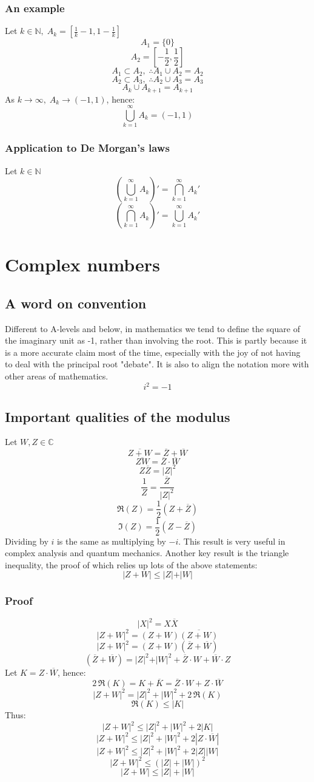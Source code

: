 \documentclass[12pt]{article}
\begin{document}
\subsubsection*{An example}
Let \(k\in \mathbb{N},\;A_k=\left[\frac{1}{k}-1,1-\frac{1}{k}\right]\)
\[A_1=\{0\}\]
\[A_2=\left[-\frac{1}{2},\frac{1}{2}\right]\]
\[A_1\subset A_2,\;\therefore A_1\cup A_2=A_2\]
\[A_2\subset A_3,\;\therefore A_2\cup A_3=A_3\]
\[A_k\cup A_{k+1}=A_{k+1}\]
As \(k\to\infty,\;A_k\to(-1,1)\), hence:
\[\bigcup_{k=1}^{\infty}A_k=(-1,1)\]
\subsubsection*{Application to De Morgan's laws}
Let \(k\in\mathbb{N}\)
\[\left(\bigcup_{k=1}^{\infty}A_k\right)'=\bigcap_{k=1}^{\infty}{A_k}'\]
\[\left(\bigcap_{k=1}^{\infty}A_k\right)'=\bigcup_{k=1}^{\infty}{A_k}'\]
\section{Complex numbers}
\subsection*{A word on convention}
Different to A-levels and below, in mathematics we tend to define the square of the imaginary unit as -1, rather than involving the root. This is partly because it is a more accurate claim most of the time, especially with the joy of not having to deal with the principal root "debate". It is also to align the notation more with other areas of mathematics.
\[i^2=-1\]
\subsection*{Important qualities of the modulus}
Let \(W,Z\in\mathbb{C}\)
\[\overline{Z+W}=\overline{Z}+\overline{W}\]
\[\overline{ZW}=\overline{Z}\cdot\overline{W}\]
\[Z\overline{Z}=\vert Z\vert^2\]
\[\frac{1}{Z}=\frac{\overline{Z}}{\vert Z\vert^2}\]
\[\Re(Z)=\frac{1}{2}(Z+\overline{Z})\]
\[\Im(Z)=\frac{1}{2}(Z-\overline{Z})\]
Dividing by \(i\) is the same as multiplying by \(-i\). This result is very useful in complex analysis and quantum mechanics. Another key result is the triangle inequality, the proof of which relies up lots of the above statements:
\[\vert Z+W\vert\leq \vert Z\vert+\vert W\vert\]
\subsubsection*{Proof}
\[\vert X\vert^2=X\overline{X}\]
\[\vert Z+W\vert^2=(Z+W)\overline{(Z+W)}\]
\[\vert Z+W\vert^2=(Z+W)(\overline{Z}+\overline{W})\]
\[(\overline{Z}+\overline{W})=\vert Z\vert^2+\vert W\vert^2+\overline{Z}\cdot W+\overline{W}\cdot Z\]
Let \(K=Z\cdot\overline{W}\), hence:
\[2\,\Re(K)=K+\overline{K}=\overline{Z}\cdot W+Z\cdot \overline{W}\]
\[|Z+W|^2=|Z|^2+|W|^2+2\,\Re(K)\]
\[\Re(K)\leq|K|\]
Thus:
\[|Z+W|^2\leq|Z|^2+|W|^2+2|K|\]
\[|Z+W|^2\leq|Z|^2+|W|^2+2|Z\cdot\overline{W}|\]
\[|Z+W|^2\leq|Z|^2+|W|^2+2|Z||W|\]
\[|Z+W|^2\leq(|Z|+|W|)^2\]
\[|Z+W|\leq|Z|+|W|\]
\end{document}
